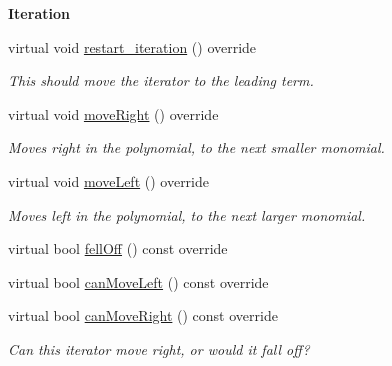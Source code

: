 \begin{Indent}\textbf{ Iteration}\par
\begin{DoxyCompactItemize}
\item 
\mbox{\label{group___iterator_group_a801bfca094868e78f20b94ced6373acc}} 
virtual void \hyperlink{group___iterator_group_a801bfca094868e78f20b94ced6373acc}{restart\+\_\+iteration} () override
\begin{DoxyCompactList}\small\item\em This should move the iterator to the leading term. \end{DoxyCompactList}\item 
\mbox{\label{group___iterator_group_a2617831ba7da31b67993a8c93d2cabbd}} 
virtual void \hyperlink{group___iterator_group_a2617831ba7da31b67993a8c93d2cabbd}{move\+Right} () override
\begin{DoxyCompactList}\small\item\em Moves right in the polynomial, to the next smaller monomial. \end{DoxyCompactList}\item 
\mbox{\label{group___iterator_group_a193d1a443318e64107378c26eff0a876}} 
virtual void \hyperlink{group___iterator_group_a193d1a443318e64107378c26eff0a876}{move\+Left} () override
\begin{DoxyCompactList}\small\item\em Moves left in the polynomial, to the next larger monomial. \end{DoxyCompactList}\item 
virtual bool \hyperlink{group___iterator_group_aa5ee700b0d03a9e333f55a87b2439920}{fell\+Off} () const override
\item 
virtual bool \hyperlink{group___iterator_group_a4094a88fd6d77894ff04960efd492ec6}{can\+Move\+Left} () const override
\item 
\mbox{\label{group___iterator_group_a428bdd3ef2ca939404abddd357c4790a}} 
virtual bool \hyperlink{group___iterator_group_a428bdd3ef2ca939404abddd357c4790a}{can\+Move\+Right} () const override
\begin{DoxyCompactList}\small\item\em Can this iterator move right, or would it fall off? \end{DoxyCompactList}\end{DoxyCompactItemize}
\end{Indent}
